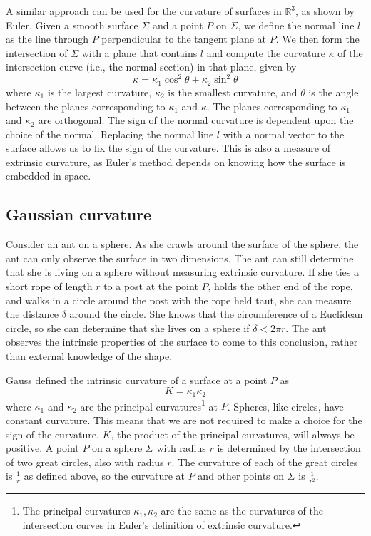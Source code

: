 \documentclass[letterpaper,titlepage]{article}
\begin{document}
A similar approach can be used for the curvature of surfaces in $\mathbb{R}^3$, as shown by Euler.
Given a smooth surface $\Sigma$ and a point $P$ on $\Sigma$, we define the normal line $l$ as the line through $P$ perpendicular to the tangent plane at $P$.
We then form the intersection of $\Sigma$ with a plane that contains $l$ and compute the curvature $\kappa$ of the intersection curve (i.e., the normal section) in that plane, given by
\[ \kappa = \kappa_1 \cos^2 \theta + \kappa_2 \sin^2 \theta \]
where $\kappa_1$ is the largest curvature, $\kappa_2$ is the smallest curvature, and $\theta$ is the angle between the planes corresponding to $\kappa_1$ and $\kappa$.
The planes corresponding to $\kappa_1$ and $\kappa_2$ are orthogonal.
The sign of the normal curvature is dependent upon the choice of the normal.
Replacing the normal line $l$ with a normal vector to the surface allows us to fix the sign of the curvature.\cite{singer}
This is also a measure of extrinsic curvature, as Euler's method depends on knowing how the surface is embedded in space.\cite{adventures}

\subsection{Gaussian curvature}
Consider an ant on a sphere.
As she crawls around the surface of the sphere, the ant can only observe the surface in two dimensions.
The ant can still determine that she is living on a sphere without measuring extrinsic curvature.
If she ties a short rope of length $r$ to a post at the point $P$, holds the other end of the rope, and walks in a circle around the post with the rope held taut, she can measure the distance $\delta$ around the circle.
She knows that the circumference of a Euclidean circle, so she can determine that she lives on a sphere if $\delta < 2\pi r$.\cite{adventures}
The ant observes the intrinsic properties of the surface to come to this conclusion, rather than external knowledge of the shape.

Gauss defined the intrinsic curvature of a surface at a point $P$ as
\[ K = \kappa_1\kappa_2 \]
where $\kappa_1$ and $\kappa_2$ are the principal curvatures\footnote{The principal curvatures $\kappa_1,\kappa_2$ are the same as the curvatures of the intersection curves in Euler's definition of extrinsic curvature.} at $P$.\cite{gauss}
Spheres, like circles, have constant curvature.
This means that we are not required to make a choice for the sign of the curvature.
$K$, the product of the principal curvatures, will always be positive.
A point $P$ on a sphere $\Sigma$ with radius $r$ is determined by the intersection of two great circles, also with radius $r$.
The curvature of each of the great circles is $\frac{1}{r}$ as defined above, so the curvature at $P$ and other points on $\Sigma$ is $\frac{1}{r^2}$.
\end{document}
